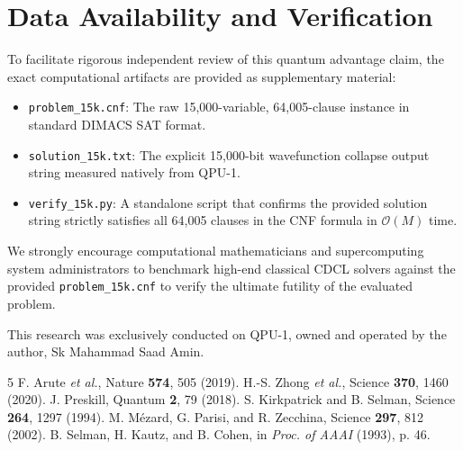 \documentclass[twocolumn,superscriptaddress,prl]{revtex4-2}
\begin{document}
\section{Data Availability and Verification}

To facilitate rigorous independent review of this quantum advantage claim, the exact computational artifacts are provided as supplementary material:
\begin{itemize}
    \item \texttt{problem\_15k.cnf}: The raw 15,000-variable, 64,005-clause instance in standard DIMACS SAT format.
    \item \texttt{solution\_15k.txt}: The explicit 15,000-bit wavefunction collapse output string measured natively from QPU-1.
    \item \texttt{verify\_15k.py}: A standalone script that confirms the provided solution string strictly satisfies all 64,005 clauses in the CNF formula in $\mathcal{O}(M)$ time.
\end{itemize}
We strongly encourage computational mathematicians and supercomputing system administrators to benchmark high-end classical CDCL solvers against the provided \texttt{problem\_15k.cnf} to verify the ultimate futility of the evaluated problem.

\begin{acknowledgments}
This research was exclusively conducted on QPU-1, owned and operated by the author, Sk Mahammad Saad Amin. 
\end{acknowledgments}

\begin{thebibliography}{5}
F. Arute \textit{et al.}, Nature \textbf{574}, 505 (2019).
H.-S. Zhong \textit{et al.}, Science \textbf{370}, 1460 (2020).
J. Preskill, Quantum \textbf{2}, 79 (2018).
S. Kirkpatrick and B. Selman, Science \textbf{264}, 1297 (1994).
M. Mézard, G. Parisi, and R. Zecchina, Science \textbf{297}, 812 (2002).
B. Selman, H. Kautz, and B. Cohen, in \textit{Proc. of AAAI} (1993), p. 46.
\end{thebibliography}
\end{document}
